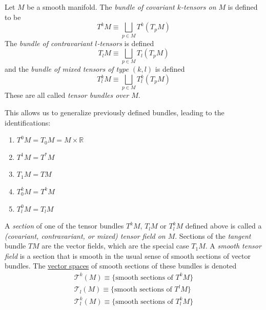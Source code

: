 \documentclass{article}
\newcounter{definition}[section]
\begin{document}
    \begin{definition}
      \label{def:bundle-of-covariant-k-tensors-on-m}
    Let $M$ be a smooth manifold. The \textit{bundle of covariant $k$-tensors on $M$} is defined to be 
    \begin{equation}
      T^k M \equiv \bigsqcup_{p \in M} T^k (T_p M)
    \end{equation}
    The \textit{bundle of contravariant $l$-tensors} is defined
    \begin{equation}
      T_l M \equiv \bigsqcup_{p \in M} T_l (T_p M)
    \end{equation}
    and the \textit{bundle of mixed tensors of type $(k, l)$} is defined
    \begin{equation}
      T^k_l M \equiv \bigsqcup_{p \in M} T_l^k (T_p M)
    \end{equation}
    These are all called \textit{tensor bundles over $M$}. 
    \end{definition}

    This allows us to generalize previously defined bundles, leading to the identifications: 
    \begin{enumerate}
        \item $T^0 M = T_0 M = M \times \mathbb{R}$
        \item $T^1 M = T^* M$
        \item $T_1 M = T M$
        \item $T^k_0 M = T^k M$
        \item $T^0_l M = T_l M$
    \end{enumerate}

    \begin{definition}
      \label{def:tensor-field}
    A \textit{section} of one of the tensor bundles $T^k M$, $T_l M$ or $T^k_l M$ defined above is called a \textit{(covariant, contravariant, or mixed) tensor field on $M$}. Sections of the \textit{tangent} bundle $TM$ are the vector fields, which are the special case $T_1 M$. A \textit{smooth tensor field} is a section that is smooth in the usual sense of smooth sections of vector bundles. The \hyperref[lin-def:vector-space]{vector spaces} of smooth sections of these bundles is denoted
    \begin{align*}
        \mathcal{T}^k (M) \equiv \{\text{smooth sections of } T^k M \} \\
        \mathcal{T}_l (M) \equiv \{\text{smooth sections of } T^l M \} \\
        \mathcal{T}^k_l (M) \equiv \{\text{smooth sections of } T^k_l M \}
    \end{align*}
    \end{definition}
\end{document}
